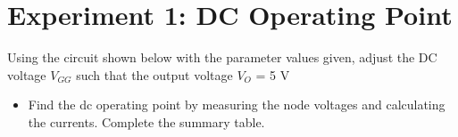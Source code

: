 \newpage

\section{Experiment 1: DC Operating Point}

Using the circuit shown below with the parameter values given, adjust the DC voltage $V_{GG}$ such that the output voltage $V_{O}$ = 5 V

\begin{itemize}

\item Find the dc operating point by measuring the node voltages and calculating the currents. Complete the summary table. 
	
\end{itemize}


